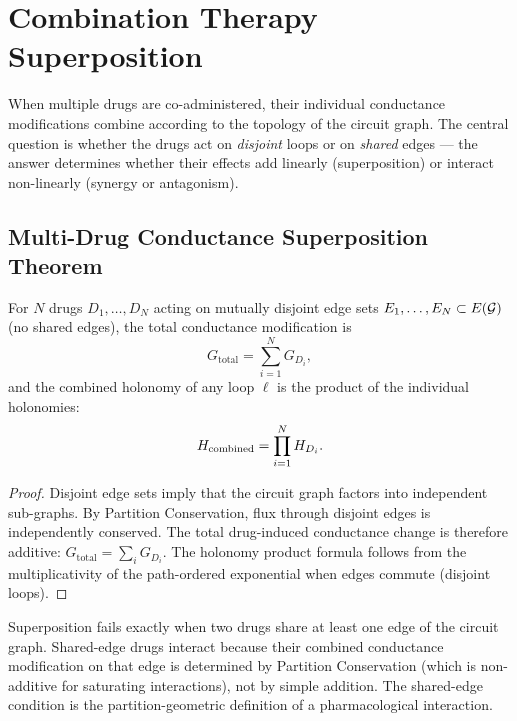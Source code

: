 \section{Combination Therapy Superposition}
\label{sec:ch09-combination-therapy}

When multiple drugs are co-administered, their individual conductance
modifications combine according to the topology of the circuit graph.  The
central question is whether the drugs act on \emph{disjoint} loops or on
\emph{shared} edges --- the answer determines whether their effects add
linearly (superposition) or interact non-linearly (synergy or antagonism).

\subsection{Multi-Drug Conductance Superposition Theorem}
\label{subsec:ch09-superposition}

\begin{theorem}
\label{thm:ch09-superposition}
For $N$ drugs $D_1,\ldots,D_N$ acting on mutually disjoint edge sets
$E_1,\ldots,E_N \subset E(\mathcal{G})$ (no shared edges), the total conductance
modification is
\begin{equation}
  G_{\mathrm{total}} = \sum_{i=1}^{N} G_{D_i},
  \label{eq:ch09-superposition-combo}
\end{equation}
and the combined holonomy of any loop $\ell$ is the product of the
individual holonomies:
\begin{equation}
  H_{\mathrm{combined}} = \prod_{i=1}^{N} H_{D_i}.
  \label{eq:ch09-hol-superposition}
\end{equation}
\end{theorem}

\begin{proof}
Disjoint edge sets imply that the circuit graph factors into independent
sub-graphs.  By Partition Conservation, flux through disjoint edges is
independently conserved.  The total drug-induced conductance change is
therefore additive: $G_{\mathrm{total}} = \sum_i G_{D_i}$.  The holonomy
product formula follows from the multiplicativity of the path-ordered
exponential when edges commute (disjoint loops).
\end{proof}

\begin{remark}
\label{rem:ch09-superposition-fail}
Superposition fails exactly when two drugs share at least one edge of the
circuit graph.  Shared-edge drugs interact because their combined conductance
modification on that edge is determined by Partition Conservation (which is
non-additive for saturating interactions), not by simple addition.  The
shared-edge condition is the partition-geometric definition of a
pharmacological interaction.
\end{remark}

